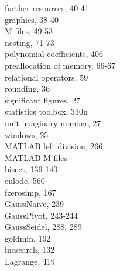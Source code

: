 \documentclass[../main.tex]{subfiles}
\begin{document}
\begin{multicols}{3}
    \hspace*{3mm}further resources, 40-41\\
    \hspace*{3mm}graphics, 38-40\\
    \hspace*{3mm}M-files, 49-53\\
    \hspace*{3mm}nesting, 71-73\\
    \hspace*{3mm}polynomial coefficients, 406\\
    \hspace*{3mm}preallocation of memory, 66-67\\
    \hspace*{3mm}relational operators, 59\\
    \hspace*{3mm}rounding, 36\\
    \hspace*{3mm}significant figures, 27\\
    \hspace*{3mm}statistics toolbox, 330n\\
    \hspace*{3mm}unit imaginary number, 27\\
    \hspace*{3mm}windows, 25\\
    MATLAB left division, 266\\
    MATLAB M-files\\
    \hspace*{3mm}bisect, 139-140\\
    \hspace*{3mm}eulode, 560\\
    \hspace*{3mm}fzerosimp, 167\\
    \hspace*{3mm}GaussNaive, 239\\
    \hspace*{3mm}GaussPivot, 243-244\\
    \hspace*{3mm}GaussSeidel, 288, 289\\
    \hspace*{3mm}goldmin, 192\\
    \hspace*{3mm}incsearch, 132\\
    \hspace*{3mm}Lagrange, 419\\

\end{multicols}
\end{document}
